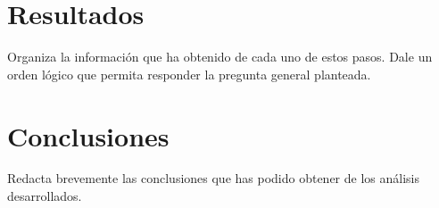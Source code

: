 \documentclass[]{book}
\begin{document}
\section{Resultados}\label{resultados}

Organiza la información que ha obtenido de cada uno de estos pasos. Dale
un orden lógico que permita responder la pregunta general planteada.

\section{Conclusiones}\label{conclusiones}

Redacta brevemente las conclusiones que has podido obtener de los
análisis desarrollados.


\end{document}
